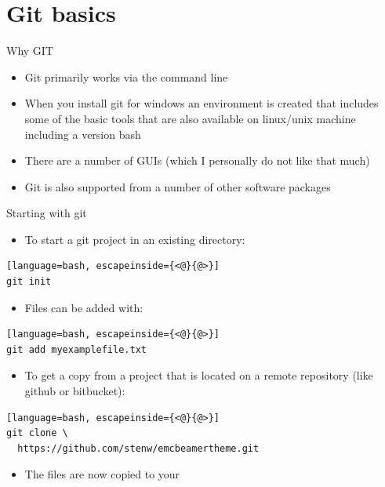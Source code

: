 \documentclass[12pt]{beamer}
\begin{document}
\section{Git basics}

\begin{frame}{Why GIT}
	\begin{itemize}	
      \item Git primarily works via the command line
      \item When you install git for windows an environment is created that includes some of the basic tools that are also available on linux/unix machine including a version \alert{bash}
      \item There are a number of GUIs (which I personally do not like that much)
      \item Git is also supported from a number of other software packages 
	\end{itemize}
\end{frame}



\begin{frame}[fragile]{Starting with git}
\begin{itemize}
\item To start a git project in an existing directory:
\end{itemize}
\begin{lstlisting}[language=bash, escapeinside={<@}{@>}]
git init
\end{lstlisting}
\begin{itemize}
\item Files can be added with:
\end{itemize}
\begin{lstlisting}[language=bash, escapeinside={<@}{@>}]
git add myexamplefile.txt
\end{lstlisting}
\begin{itemize}
\item To get a copy from a project that is located on a remote repository (like github or bitbucket):
\end{itemize}
\begin{lstlisting}[language=bash, escapeinside={<@}{@>}]
git clone \
  https://github.com/stenw/emcbeamertheme.git
\end{lstlisting}
\begin{itemize}
\item The files are now copied to your \textbf{}
\end{itemize}
\end{frame}
\end{document}

